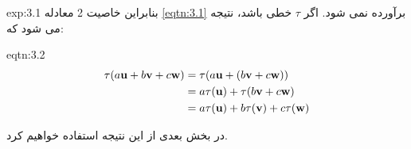 {\begin{spacing}{1.5}
\begin{example}{exp:3.1}
            بنابراین خاصیت 2 معادله \ref{eqtn:3.1} برآورده نمی شود.
            اگر $\tau$ خطی باشد، نتیجه می شود که:

            \begin{eqtn}{eqtn:3.2}
                \centering
                \begin{equation*}
                    \centering
                    \begin{split}
                        \tau(a\textbf{u}+b\textbf{v}+c\textbf{w})&=\tau(a\textbf{u}+(b\textbf{v}+c\textbf{w})) \\
                        &=a\tau(\textbf{u})+\tau(b\textbf{v}+c\textbf{w})\\
                        &=a\tau(\textbf{u})+b\tau(\textbf{v})+c\tau(\textbf{w})
                    \end{split}
                \end{equation*}
            \end{eqtn}

            در بخش بعدی از این نتیجه استفاده خواهیم کرد.
        \end{example}
    \end{spacing}
}

